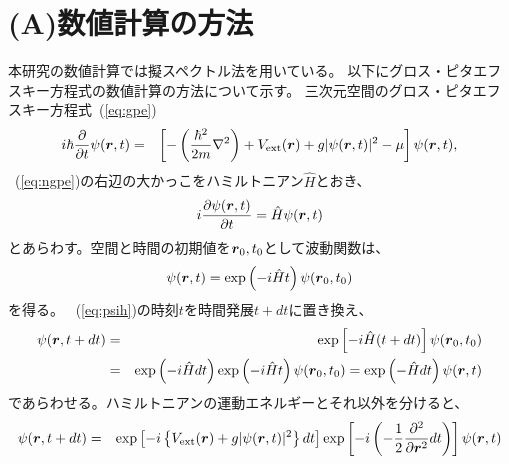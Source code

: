 \documentclass[12pt,a4paper]{jbook}
\def\Vec#1{\mbox{\boldmath $#1$}}			%
\begin{document}
        \section{(A)数値計算の方法}
            本研究の数値計算では擬スペクトル法を用いている。
            以下にグロス・ピタエフスキー方程式の数値計算の方法について示す。
            \label{s:numeric}
            三次元空間のグロス・ピタエフスキー方程式~(\ref{eq:gpe})
		    \begin{eqnarray}
                \label{eq:ngpe}
			    i \hbar \frac{\partial}{\partial t} \psi ( \Vec{r}, t ) & = &
                \left[
			    - \left( \frac{\hbar^2}{2m} \nabla^2 \right)
                + V_{\rm{ext}}(\Vec{r})
			    + g | \psi(\Vec{r}, t) |^2
                - \mu
                \right]\psi(\Vec{r},t),
		    \end{eqnarray}
            ~(\ref{eq:ngpe})の右辺の大かっこをハミルトニアン$\hat{H}$とおき、
            \begin{eqnarray}
               i \frac{\partial \psi(\Vec{r}, t)}{\partial t} =
               \hat{H} \psi(\Vec{r}, t)
            \end{eqnarray}
            とあらわす。空間と時間の初期値を$\Vec{r}_0,t_0$として波動関数は、
            \begin{eqnarray}
                \label{eq:psih}
                \psi(\Vec{r}, t) = \exp \left( -i \hat{H} t \right) \psi(\Vec{r}_0, t_0)
            \end{eqnarray}
            を得る。
            ~(\ref{eq:psih})の時刻$t$を時間発展$t+dt$に置き換え、
            \begin{eqnarray}
                \psi(\Vec{r},t+dt) & = & \exp \left[
                        -i \hat{H}(t+dt)
                    \right]
                        \psi(\Vec{r}_0,t_0)
                \\
                & = & \exp \left( -i \hat{H}dt \right) \exp \left( -i \hat{H} t \right)\psi(\Vec{r}_0,t_0) 
                = \exp \left(- \hat{H}dt \right) \psi(\Vec{r},t)
            \end{eqnarray}
            であらわせる。ハミルトニアンの運動エネルギーとそれ以外を分けると、
            \begin{eqnarray}
                \psi(\Vec{r},t+dt) & = & \exp \left[
                        -i \left \{ V_{\rm{ext}}(\Vec{r}) +g|\psi(\Vec{r},t)|^2 \right \} dt
                    \right]
                    \exp \left[
                        -i \left( -\frac{1}{2} \frac{\partial^2}{\partial \Vec{r}^2} dt \right)
                    \right] \psi(\Vec{r}, t)
            \end{eqnarray}
\end{document}
